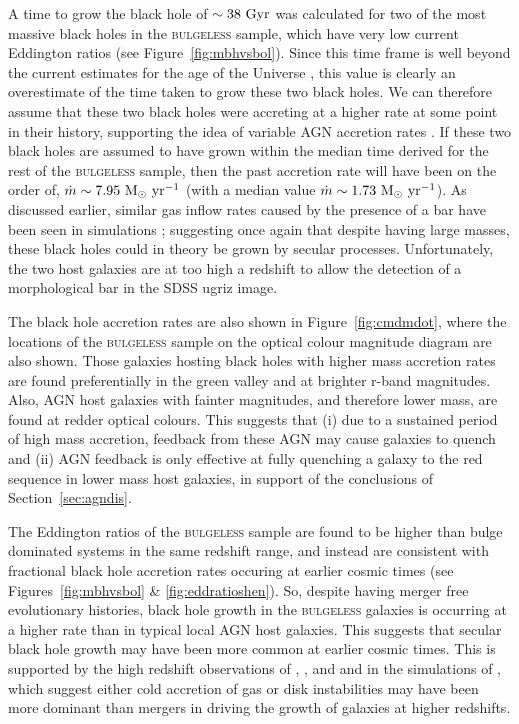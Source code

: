 {A time to grow the black hole of $\sim 38 ~\rm{Gyr}$ was calculated for two of the most massive black holes in the \textsc{bulgeless} sample, which have very low current Eddington ratios (see Figure~\ref{fig:mbhvsbol}). Since this time frame is well beyond the current estimates for the age of the Universe \citep[$\sim13.8 ~\rm{Gyr}$;][]{planck16}, this value is clearly an overestimate of the time taken to grow these two black holes. We can therefore assume that these two black holes were accreting at a higher rate at some point in their history, supporting the idea of variable AGN accretion rates \citep{martini01, yu02, schawinski15}.  If these two black holes are assumed to have grown within the median time derived for the rest of the \textsc{bulgeless} sample, then the past accretion rate will have been on the order of, $\dot{m} \sim 7.95 ~\rm{M}_{\odot}~\rm{yr}^{-1}$ (with a median value $\dot{m} \sim 1.73 ~\rm{M}_{\odot}~\rm{yr}^{-1}$). As discussed earlier, similar gas inflow rates caused by the presence of a bar have been seen in simulations \citep{friedli93}; suggesting once again that despite having large masses, these black holes could in theory be grown by secular processes. Unfortunately, the two host galaxies are at too high a redshift to allow the detection of a morphological bar in the SDSS ugriz image. 

The black hole accretion rates are also shown in Figure~\ref{fig:cmdmdot}, where the locations of the \textsc{bulgeless} sample on the optical colour magnitude diagram are also shown. Those galaxies hosting black holes with higher mass accretion rates are found preferentially in the green valley and at brighter r-band magnitudes. Also, AGN host galaxies with fainter magnitudes, and therefore lower mass, are found at redder optical colours. This suggests that (i) due to a sustained period of high mass accretion, feedback from these AGN may cause galaxies to quench and (ii) AGN feedback is only effective at fully quenching a galaxy to the red sequence in lower mass host galaxies, in support of the conclusions of Section~\ref{sec:agndis}.

The Eddington ratios of the \textsc{bulgeless} sample are found to be higher than bulge dominated systems in the same redshift range, and instead are consistent with fractional black hole accretion rates occuring at earlier cosmic times (see Figures~\ref{fig:mbhvsbol} \& \ref{fig:eddratioshen}). So, despite having merger free evolutionary histories, black hole growth in the \textsc{bulgeless} galaxies is occurring at a higher rate than in typical local AGN host galaxies. This suggests that secular black hole growth may have been more common at earlier cosmic times. This is supported by the high redshift observations of \cite{georgakakis09}, \cite{cisternas11}, \cite{schawinski11} and \cite{kocevski12} and in the simulations of \cite{hopkins06c}, \cite{bournard11,bournaud12} which suggest either cold accretion of gas or disk instabilities may have been more dominant than mergers in driving the growth of galaxies at higher redshifts. 


}
